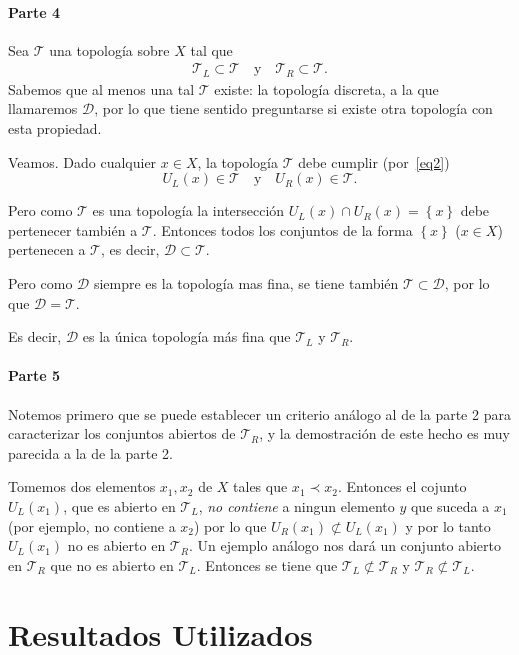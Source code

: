 \documentclass[fleqn,leqno,10pt,letterpaper,draft]{article}
\begin{document}
\paragraph{Parte 4}%

Sea $\mathcal{T}$ una topología sobre $X$ tal que
\begin{align}\label{eq2}
	\mathcal{T}_L\subset\mathcal{T}\quad\text{y}\quad\mathcal{T}_R\subset\mathcal{T}.
\end{align}
Sabemos que al menos una tal $\mathcal{T}$ existe: la topología discreta, a la que llamaremos $\mathcal{D}$, por lo que
tiene sentido preguntarse si existe otra topología con esta propiedad.

Veamos. Dado cualquier $x\in X$, la topología $\mathcal{T}$ debe cumplir (por~\ref{eq2})
\[
	U_L(x)\in\mathcal{T}\quad\text{y}\quad U_R(x)\in\mathcal{T}.
\]

Pero como $\mathcal{T}$ es una topología la intersección $U_L(x)\cap U_R(x)=\left\{ x \right\}$ debe pertenecer también a $\mathcal{T}.$
Entonces todos los conjuntos de la forma $\left\{ x \right\}$ ($x\in X$) pertenecen a $\mathcal{T}$, es decir, $\mathcal{D}\subset\mathcal{T}$.

Pero como $\mathcal{D}$ siempre es la topología mas fina, se tiene también $\mathcal{T}\subset\mathcal{D}$, por lo que
$\mathcal{D}=\mathcal{T}$.

Es decir, $\mathcal{D}$ es la única topología más fina que $\mathcal{T}_L$ y $\mathcal{T}_R$.
\paragraph{Parte 5}%

Notemos primero que se puede establecer un criterio análogo al de la parte 2
para caracterizar los conjuntos abiertos de $\mathcal{T}_R$, y la demostración de este hecho
es muy parecida a la de la parte 2.

Tomemos dos elementos $x_1,x_2$ de $X$ tales que $x_1\prec x_2$. Entonces el cojunto $U_L(x_1)$, que
es abierto en $\mathcal{T}_L$, \emph{no contiene} a ningun elemento $y$ que suceda a $x_1$ (por ejemplo,
no contiene a $x_2$) por lo que $U_R(x_1)\not\subset U_L(x_1)$ y por lo tanto $U_L(x_1)$ no es abierto
en $\mathcal{T}_R$. Un ejemplo análogo nos dará un conjunto abierto en $\mathcal{T}_R$ que no es abierto
en $\mathcal{T}_L$. Entonces se tiene que $\mathcal{T}_L\not\subset\mathcal{T}_R$ y $\mathcal{T}_R\not\subset\mathcal{T}_L$.

\section[Resultados Utilizados]{Resultados Utilizados}%
\label{sec:resultados_utilizados}
\end{document}
